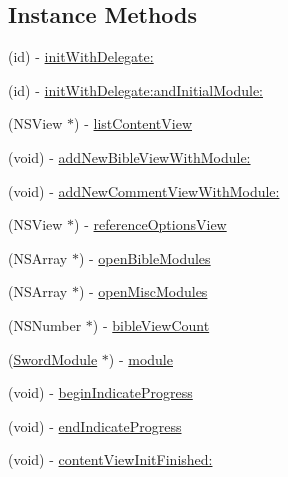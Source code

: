 \subsection*{Instance Methods}
\begin{DoxyCompactItemize}
\item 
(id) -\/ \hyperlink{interface_bible_combi_view_controller_a31987d71b58e0520588676a4f6896d2c}{init\-With\-Delegate\-:}
\item 
(id) -\/ \hyperlink{interface_bible_combi_view_controller_a8cbbf069a27b2a4be367303e9ebaea10}{init\-With\-Delegate\-:and\-Initial\-Module\-:}
\item 
(N\-S\-View $\ast$) -\/ \hyperlink{interface_bible_combi_view_controller_a726ea6c924bda6200d37751ca723d7b5}{list\-Content\-View}
\item 
(void) -\/ \hyperlink{interface_bible_combi_view_controller_aabdc2c1972584244a444a0086e859952}{add\-New\-Bible\-View\-With\-Module\-:}
\item 
(void) -\/ \hyperlink{interface_bible_combi_view_controller_a396eb54ec292f2d0093387159cd2223e}{add\-New\-Comment\-View\-With\-Module\-:}
\item 
(N\-S\-View $\ast$) -\/ \hyperlink{interface_bible_combi_view_controller_a20e0066c6ffdb151067053c9e5b00129}{reference\-Options\-View}
\item 
(N\-S\-Array $\ast$) -\/ \hyperlink{interface_bible_combi_view_controller_aa495b0ca74cf23490e3c2b2adc1cad40}{open\-Bible\-Modules}
\item 
(N\-S\-Array $\ast$) -\/ \hyperlink{interface_bible_combi_view_controller_a58517e2b235799e7375ff264d76800a5}{open\-Misc\-Modules}
\item 
(N\-S\-Number $\ast$) -\/ \hyperlink{interface_bible_combi_view_controller_ab9ee04c2c253902a138fb5e5732f98dd}{bible\-View\-Count}
\item 
(\hyperlink{interface_sword_module}{Sword\-Module} $\ast$) -\/ \hyperlink{interface_bible_combi_view_controller_a1f3f4f8432ddf2a3cbd896bc378b688b}{module}
\item 
(void) -\/ \hyperlink{interface_bible_combi_view_controller_ab140e379b24385c3f31d9fd4a5fd551c}{begin\-Indicate\-Progress}
\item 
(void) -\/ \hyperlink{interface_bible_combi_view_controller_aec838665fe7ae1c4e48312dc17d6ad87}{end\-Indicate\-Progress}
\item 
(void) -\/ \hyperlink{interface_bible_combi_view_controller_a0bd73ec236f8055ac6566b39ddf66add}{content\-View\-Init\-Finished\-:}
\item 

\end{DoxyCompactItemize}
